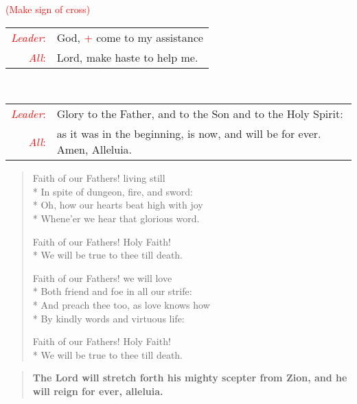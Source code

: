 \documentclass[letterpaper,14pt]{extarticle}
\newcommand{\side}[1]{\flagverse{\textcolor{red}{\textit{#1}}:}}
\newcommand{\sidestar}[1]{\textcolor{red}{\textit{#1}:}}
\newcommand{\rednote}[1]{\textcolor{red}{#1}}
\newlength{\oldindent}
\newcommand{\antiphon}[2]{
	\setlength{\oldindent}{\vindent}
	\setlength{\vindent}{0em}
	\begin{verse}
	\side{#1} \textbf{#2}
	\end{verse}
	\setlength{\vindent}{\oldindent}
}
\newcommand{\intercession}[2]{
	\begin{tabular}[h]{r p{4.25in}}
		\sidestar{Leader} & #1 \\
		\sidestar{All} & #2
	\end{tabular}}
\begin{document}
\hspace{\leftmargini}\rednote{(Make sign of cross)}\\
\intercession{God, \rednote{+} come to my assistance}
{Lord, make haste to help me.}\\
\intercession{Glory to the Father, and to the Son and to the Holy Spirit:}
{as it was in the beginning, is now, and will be for ever. Amen, Alleluia.}

\begin{verse}
Faith of our Fathers! living still \\*
In spite of dungeon, fire, and sword: \\*
Oh, how our hearts beat high with joy \\*
Whene'er we hear that glorious word.

Faith of our Fathers! Holy Faith! \\*
We will be true to thee till death.

Faith of our Fathers! we will love \\*
Both friend and foe in all our strife: \\*
And preach thee too, as love knows how\\*
By kindly words and virtuous life:

Faith of our Fathers! Holy Faith!\\*
We will be true to thee till death.

\end{verse}
{}
\antiphon{Leader 1}{The Lord will stretch forth his mighty scepter from Zion, and he will reign for ever,
alleluia.}  
\end{document}
